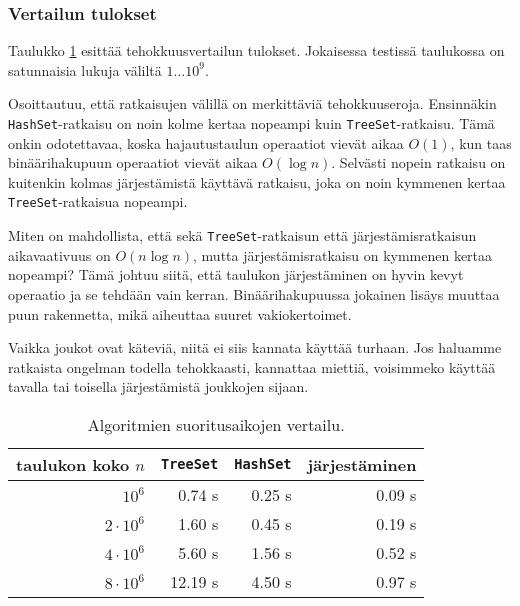 \subsubsection{Vertailun tulokset}

Taulukko \ref{tab:eriver} esittää tehokkuusvertailun tulokset.
Jokaisessa testissä taulukossa on satunnaisia lukuja väliltä $1 \dots 10^9$.

Osoittautuu, että ratkaisujen välillä on merkittäviä tehokkuuseroja.
Ensinnäkin \texttt{HashSet}-ratkaisu on noin kolme kertaa
nopeampi kuin \texttt{TreeSet}-ratkaisu.
Tämä onkin odotettavaa, koska hajautustaulun
operaatiot vievät aikaa $O(1)$, kun taas binäärihakupuun
operaatiot vievät aikaa $O(\log n)$.
Selvästi nopein ratkaisu on kuitenkin kolmas järjestämistä
käyttävä ratkaisu, joka on noin kymmenen kertaa
\texttt{TreeSet}-ratkaisua nopeampi.

Miten on mahdollista, että sekä \texttt{TreeSet}-ratkaisun että
järjestämisrat\-kaisun aikavaativuus on $O(n \log n)$, mutta
järjestämisratkaisu on kymmenen kertaa nopeampi?
Tämä johtuu siitä, että taulukon järjestäminen on hyvin kevyt
operaatio ja se tehdään vain kerran.
Binäärihakupuussa jokainen lisäys muuttaa puun rakennetta,
mikä aiheuttaa suuret vakiokertoimet.

Vaikka joukot ovat käteviä, niitä ei siis kannata
käyttää turhaan.
Jos haluamme ratkaista ongelman todella tehokkaasti,
kannattaa miettiä, voisimmeko käyttää tavalla tai toisella
järjestämistä joukkojen sijaan.

\begin{table}
\center
\begin{tabular}{rrrr}
taulukon koko $n$ & \texttt{TreeSet} & \texttt{HashSet} & järjestäminen \\
\hline
$10^6$ & 0.74 s & 0.25 s & 0.09 s \\
$2 \cdot 10^6$ & 1.60 s & 0.45 s & 0.19 s \\
$4 \cdot 10^6$ & 5.60 s & 1.56 s & 0.52 s \\
$8 \cdot 10^6$ & 12.19 s & 4.50 s & 0.97 s \\
\end{tabular}
\caption{Algoritmien suoritusaikojen vertailu.}
\label{tab:eriver}
\end{table}
